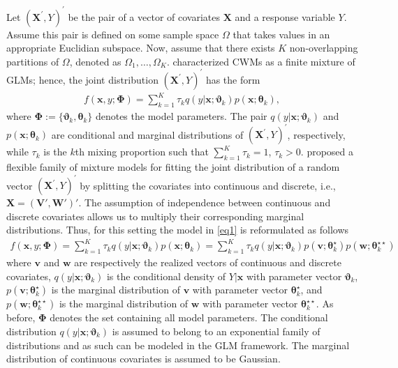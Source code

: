 \documentclass[12pt,letterpaper]{article}
\numberwithin{equation}{section}
\numberwithin{equation}{section}
\numberwithin{equation}{section}
\begin{document}
Let $(\bm{X^{'}}, Y)^{'}$  be the pair of a vector of covariates  $\bm{X}$ and a response variable $Y$. Assume this pair is defined on some sample space $\Omega$ that takes values in an appropriate Euclidian subspace. Now, assume that there exists $K$ non-overlapping partitions of $\Omega$, denoted as $\Omega_1, \ldots, \Omega_K$.  \cite{Gershenfeld:1997} characterized CWMs as a finite mixture of GLMs; hence, the joint distribution $(\bm{X^{'}}, Y )^{'}$ has the form
 \begin{align}
 f(\bm x, y; \bm{\Phi})= \sum_{k=1}^{K} \tau_k q(y|\bm{x};\bm{\vartheta}_k)p(\bm{x};\bm{\theta}_k),
\label{eq1}
\end{align}
where $\bm{\Phi}:=\{\bm{\vartheta}_k, \bm{\theta}_k\}$ denotes the model parameters.
%
The pair $q(y|\bm{x};\bm{\vartheta}_k)$ and $p(\bm{x};\bm{\theta}_k)$ are conditional and marginal distributions of $(\bm{X^{'}}, Y)^{'}$, respectively, while $\tau_k$ is the $k$th mixing proportion such that $\sum_{k=1}^{K}\tau_k=1$, $\tau_k>0$.
\cite{Ingrassia+Punzo+Vittadini+Minotti:2015} proposed a flexible family of mixture models for fitting the joint distribution of a random vector $(\bm{X^{'}}, Y)^{'}$ by splitting the covariates into continuous and discrete, i.e., $ \bm{X}=(\bm{V}',  \bm{W}')'$. The assumption of independence between continuous and discrete covariates allows us to multiply their corresponding marginal distributions. Thus, for this setting the model in \eqref{eq1} is reformulated as follows
\begin{align}
 f(\bm{x}, y; \bm{\Phi})= \sum_{k=1}^{K} \tau_k q(y|\bm{x};\bm{\vartheta}_k)p(\bm{x};\bm{\theta}_k)=\sum_{k=1}^{K} \tau_k q(y|\bm{x};\bm{\vartheta}_k)p(\bm{v}; \bm{\theta}_k^{\star})p(\bm{w};\bm{\theta}_k^{\star\star})
\label{eq2}
\end{align}
where $\bm{v}$ and $\bm{w}$ are respectively the realized vectors of continuous and discrete covariates, $q(y|\bm{x};\bm{\vartheta}_k)$ is the conditional density of $Y|\bm{x}$ with parameter vector $\bm{\vartheta}_k$, $p(\bm{v};\bm{\theta}_k^{\star})$ is the marginal distribution of $\bm{v}$ with parameter vector $\bm{\theta}_k^{\star}$, and $p(\bm{w};\bm{\theta}_k^{\star\star})$ is the marginal distribution of $\bm{w}$ with parameter vector $\bm{\theta}_k^{\star\star}$. As before, $\bm{\Phi}$ denotes the set containing all model parameters. %
The conditional distribution $q(y|\bm{x};\bm{\vartheta}_k)$ is assumed to belong to an exponential family of distributions and as such can be modeled in the GLM framework. The marginal distribution of continuous covariates is assumed to be Gaussian. 
\end{document}
